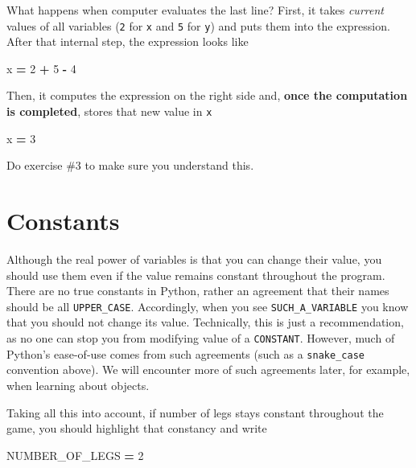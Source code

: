 \documentclass[
]{book}
\newenvironment{Shaded}{\begin{snugshade}}{\end{snugshade}}
\newcommand{\DecValTok}[1]{\textcolor[rgb]{0.00,0.00,0.81}{#1}}
\newcommand{\NormalTok}[1]{#1}
\newcommand{\OperatorTok}[1]{\textcolor[rgb]{0.81,0.36,0.00}{\textbf{#1}}}
\begin{document}
What happens when computer evaluates the last line? First, it takes \emph{current} values of all variables (\texttt{2} for \texttt{x} and \texttt{5} for \texttt{y}) and puts them into the expression. After that internal step, the expression looks like

\begin{Shaded}
\begin{Highlighting}[]
\NormalTok{x }\OperatorTok{=} \DecValTok{2} \OperatorTok{+} \DecValTok{5} \OperatorTok{{-}} \DecValTok{4}
\end{Highlighting}
\end{Shaded}

Then, it computes the expression on the right side and, \textbf{once the computation is completed}, stores that new value in \texttt{x}

\begin{Shaded}
\begin{Highlighting}[]
\NormalTok{x }\OperatorTok{=} \DecValTok{3}
\end{Highlighting}
\end{Shaded}

Do exercise \#3 to make sure you understand this.

\hypertarget{constants}{%
\section{Constants}\label{constants}}

Although the real power of variables is that you can change their value, you should use them even if the value remains constant throughout the program. There are no true constants in Python, rather an agreement that their names should be all \texttt{UPPER\_CASE}. Accordingly, when you see \texttt{SUCH\_A\_VARIABLE} you know that you should not change its value. Technically, this is just a recommendation, as no one can stop you from modifying value of a \texttt{CONSTANT}. However, much of Python's ease-of-use comes from such agreements (such as a \texttt{snake\_case} convention above). We will encounter more of such agreements later, for example, when learning about objects.

Taking all this into account, if number of legs stays constant throughout the game, you should highlight that constancy and write

\begin{Shaded}
\begin{Highlighting}[]
\NormalTok{NUMBER\_OF\_LEGS }\OperatorTok{=} \DecValTok{2}
\end{Highlighting}
\end{Shaded}
\end{document}

